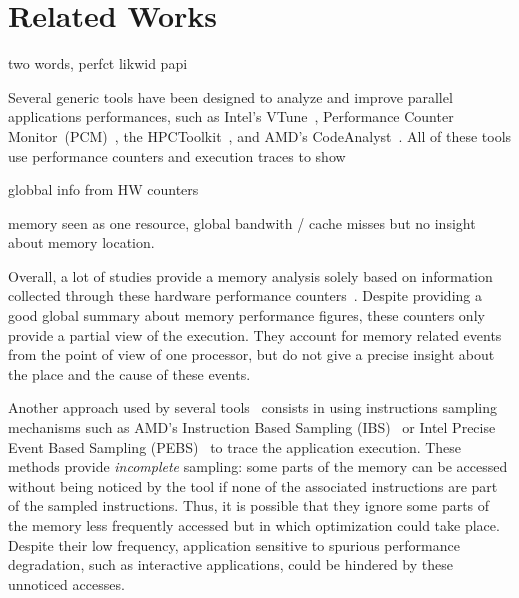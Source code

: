 
\section{Related Works}
\label{sec:related}

two words, perfct likwid papi



Several generic tools have been designed to analyze and improve parallel
applications performances, such as Intel's VTune~\cite{Reinders05VTune},
Performance Counter Monitor~(PCM)~\cite{Intel2012b}, the
HPCToolkit~\cite{Adhianto10HPCTOOLKIT}, and AMD's
CodeAnalyst~\cite{Drongowski2008}. All of these tools use performance
counters and execution traces to show

globbal info from HW counters

memory seen as one resource, global bandwith / cache misses but no insight
about memory location.



Overall, a lot of studies provide a memory analysis solely based
on information collected through these hardware performance counters~\cite{Majo13(Mis)understanding,
Jiang14Understanding,Bosch00Rivet,Weyers14Visualization,Tao01Visualizing,DeRose01Hardware}.
Despite providing a good global summary about memory performance figures, these counters only provide a partial view of the execution. They
account for memory related events from the point of view of one processor, but
do not give a precise insight about the place and the cause of these events.

Another approach used by several
tools~\cite{Lachaize12MemProf,McCurdy10Memphis,Liu14Tool,Gimenez14Dissecting}
consists in using instructions sampling mechanisms such as AMD's Instruction Based Sampling
(IBS)~\cite{Drongowski07Instructionbased} or Intel Precise Event Based
Sampling (PEBS)~\cite{Levinthal2009} to trace the application execution. These methods
provide \emph{incomplete} sampling: some parts of the memory can be accessed without
being noticed by the tool if none of the associated instructions are part of the sampled
instructions.
Thus, it is possible that they ignore some parts of the memory less frequently accessed but in which
optimization could take place.
Despite their low frequency, application sensitive to spurious performance degradation, such as interactive applications, could be hindered by these unnoticed
accesses.

